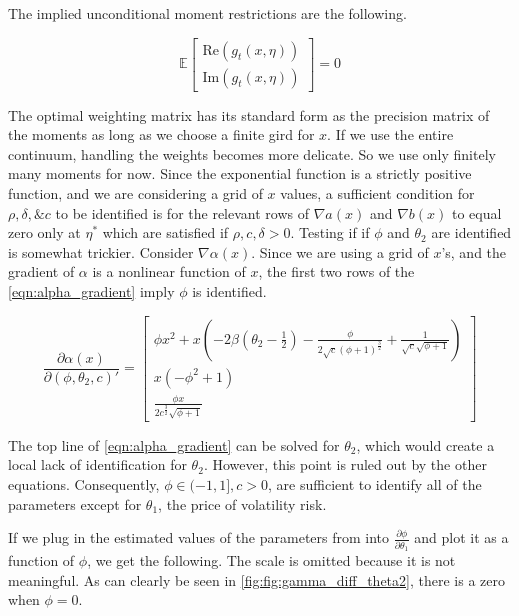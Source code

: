 \documentclass[11pt]{article}
\newcommand*{\E}{\mathbb{E}}
\begin{document}
The implied unconditional moment restrictions are the following.  

\begin{equation}
    \E \begin{bmatrix}  \mathrm{Re} (g_t(x, \eta)) \\ \mathrm{Im} (g_t(x, \eta)) \end{bmatrix} = 0
\end{equation}


The optimal weighting matrix has its standard form as the precision matrix of the moments as long as we choose a
finite gird for $x$. 
If we use the entire continuum, handling the weights becomes more delicate. 
So we use only finitely many moments for now.
Since the exponential function is a strictly positive function, and we are considering a grid of $x$ values, a
sufficient condition for $\rho, \delta, \& c$ to be identified is for the relevant rows of $\nabla a(x)$ and
$\nabla b(x)$ to equal zero only at $\eta^{*}$ which are satisfied if $\rho, c, \delta > 0$.
Testing if if $\phi$ and $\theta_2$ are identified is somewhat trickier. 
Consider $\nabla \alpha(x)$. 
Since we are using a grid of $x$'s, and the gradient of $\alpha$ is a nonlinear function of $x$, the first two
rows of the \cref{eqn:alpha_gradient} imply $\phi$ is identified.

\begin{equation}
    \label{eqn:alpha_gradient}
    \frac{\partial \alpha(x)}{\partial (\phi, \theta_2, c)'}  = \begin{bmatrix} \phi x^{2} + x \left(- 2 \beta
    \left(\theta_{2} - \frac{1}{2}\right) - \frac{\phi}{2 \sqrt{c} \left(\phi + 1\right)^{\frac{3}{2}}} +
    \frac{1}{\sqrt{c} \sqrt{\phi + 1}}\right) \\ x \left(- \phi^{2} + 1\right) \\ \frac{\phi x}{2 c^{\frac{3}{2}}
    \sqrt{\phi + 1}} \end{bmatrix} 
\end{equation}

The top line of \cref{eqn:alpha_gradient} can be solved for $\theta_2$, which would create a local lack of
identification for $\theta_2$.
However, this point is ruled out by the other equations.
Consequently,  $\phi \in (-1,1], c > 0$, are sufficient to identify all of the parameters except for $\theta_1$,
the price of volatility risk.

If we plug in the estimated values of the parameters from \textcite{khrapov2016affine} into $\frac{\partial
\phi}{\partial \theta_1}$ and plot it as a function of $\phi$,  we get the following.
The scale is omitted because it is not meaningful. 
As can clearly be seen in \cref{fig:fig:gamma_diff_theta2}, there is a zero when $\phi = 0$.
\end{document}
